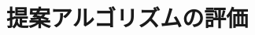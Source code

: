 \documentclass[11pt, a4paper, oneside, twocolumn]{jsarticle}
\newcommand{\mysys}{\textsc{RefSyn}}
\begin{document}

\section{提案アルゴリズムの評価}


\end{document}
